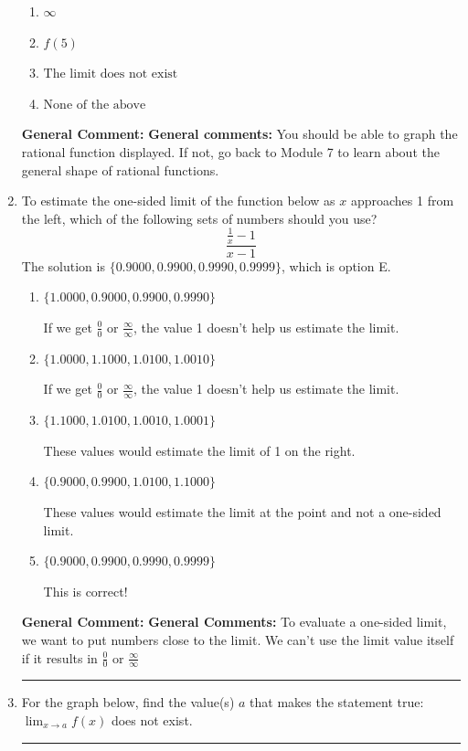 \documentclass{extbook}[14pt]
\newcommand{\litem}[1]{\item #1

\rule{\textwidth}{0.4pt}}
\begin{document}
\begin{enumerate}
{\begin{enumerate}[label=\Alph*.]
\item \( \infty \)


\item \( f(5) \)


\item \( \text{The limit does not exist} \)


\item \( \text{None of the above} \)


\end{enumerate}

\textbf{General Comment:} \textbf{General comments:} You should be able to graph the rational function displayed. If not, go back to Module 7 to learn about the general shape of rational functions.
}
\litem{
To estimate the one-sided limit of the function below as $x$ approaches 1 from the left, which of the following sets of numbers should you use?
\[ \frac{\frac{1}{x} - 1}{x - 1} \]The solution is \( \{ 0.9000, 0.9900, 0.9990, 0.9999 \} \), which is option E.\begin{enumerate}[label=\Alph*.]
\item \( \{ 1.0000, 0.9000, 0.9900, 0.9990 \} \)

If we get $\frac{0}{0}$ or $\frac{\infty}{\infty}$, the value 1 doesn't help us estimate the limit.
\item \( \{ 1.0000, 1.1000, 1.0100, 1.0010 \} \)

If we get $\frac{0}{0}$ or $\frac{\infty}{\infty}$, the value 1 doesn't help us estimate the limit.
\item \( \{ 1.1000, 1.0100, 1.0010, 1.0001 \} \)

These values would estimate the limit of 1 on the right.
\item \( \{ 0.9000, 0.9900, 1.0100, 1.1000 \} \)

These values would estimate the limit at the point and not a one-sided limit.
\item \( \{ 0.9000, 0.9900, 0.9990, 0.9999 \} \)

This is correct!
\end{enumerate}

\textbf{General Comment:} \textbf{General Comments:} To evaluate a one-sided limit, we want to put numbers close to the limit. We can't use the limit value itself if it results in $\frac{0}{0}$ or $\frac{\infty}{\infty}$
}
\litem{
For the graph below, find the value(s) $a$ that makes the statement true: $ \displaystyle \lim_{x \rightarrow a} f(x)$ does not exist.

}
\end{enumerate}
\end{document}

